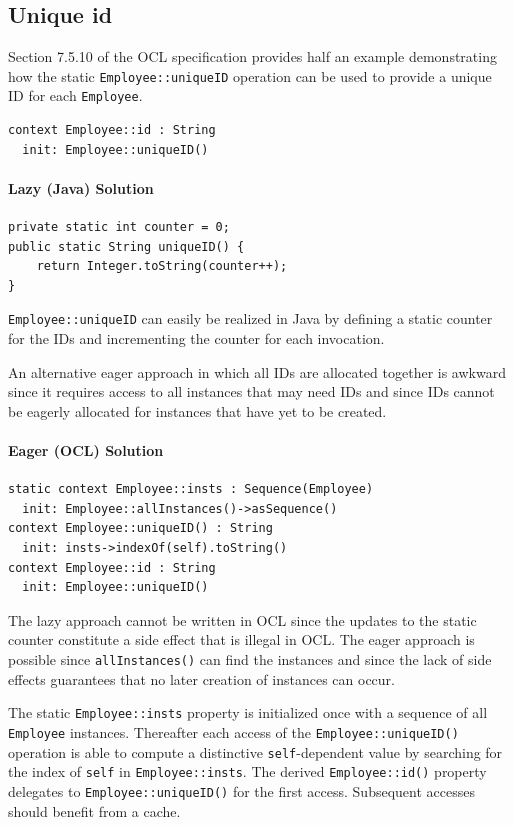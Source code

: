 \documentclass[sigconf]{acmart}
\begin{document}
\subsection{Unique id}\label{UniqueId}

Section 7.5.10 of the OCL specification provides half an example demonstrating how the static \verb|Employee::uniqueID| operation can be used to provide a unique ID for each \verb|Employee|.
\begin{verbatim}
context Employee::id : String
  init: Employee::uniqueID()
\end{verbatim} 

\paragraph{Lazy (Java) Solution}

\begin{verbatim}
private static int counter = 0;
public static String uniqueID() {
    return Integer.toString(counter++);
}
\end{verbatim} 

\verb|Employee::uniqueID| can easily be realized in Java by defining a static counter for the IDs and incrementing the counter for each invocation.

An alternative eager approach in which all IDs are allocated together is awkward since it requires access to all instances that may need IDs and since IDs cannot be eagerly allocated for instances that have yet to be created.

\paragraph{Eager (OCL) Solution}

\begin{verbatim}
static context Employee::insts : Sequence(Employee)
  init: Employee::allInstances()->asSequence()
context Employee::uniqueID() : String
  init: insts->indexOf(self).toString()
context Employee::id : String
  init: Employee::uniqueID()
\end{verbatim} 

The lazy approach cannot be written in OCL since the updates to the static counter constitute a side effect that is illegal in OCL. The eager approach is possible since \verb|allInstances()| can find the instances and since the lack of side effects guarantees that no later creation of instances can occur.

The static \verb|Employee::insts| property is initialized once with a sequence of all \verb|Employee| instances. Thereafter each access of the \verb|Employee::uniqueID()| operation is able to compute a distinctive \verb|self|-dependent value by searching for the index of \verb|self| in \verb|Employee::insts|. The derived \verb|Employee::id()| property delegates to \verb|Employee::uniqueID()| for the first access. Subsequent accesses should benefit from a cache.
\end{document}
